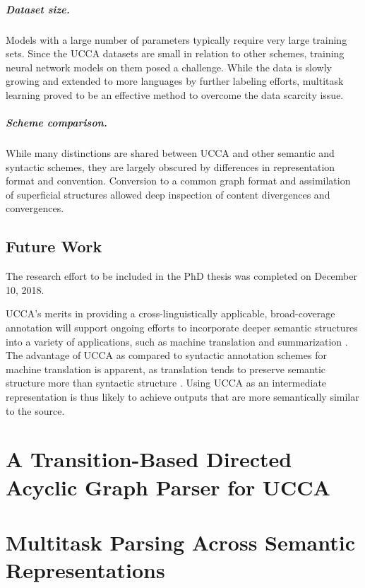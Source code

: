 \documentclass[12pt]{report}
\begin{document}
\paragraph{Dataset size.}
Models with a large number of parameters typically require very large
training sets.
Since the UCCA datasets are small in relation to other schemes,
training neural network models on them posed a challenge.
While the data is slowly growing and extended to more languages by further labeling efforts,
multitask learning proved to be an effective method to overcome the data scarcity issue.

\paragraph{Scheme comparison.}
While many distinctions are shared between UCCA and other semantic and syntactic schemes,
they are largely obscured by differences in representation format and convention.
Conversion to a common graph format and assimilation of superficial structures
allowed deep inspection of content divergences and convergences.


\section{Future Work}\label{sec:future_work}

The research effort to be included in the PhD thesis was completed on December 10, 2018.

UCCA's merits in providing a cross-linguistically applicable,
broad-coverage annotation will support ongoing efforts to incorporate deeper
semantic structures into a variety of applications, such as machine translation
\cite{jones2012semantics} and summarization \cite{liu2015toward}.
The advantage of UCCA as compared to syntactic annotation schemes for machine translation is apparent,
as translation tends to preserve semantic structure more than syntactic structure \cite{sulem2015conceptual}.
Using UCCA as an intermediate representation is thus likely to achieve outputs that are more
semantically similar to the source.

\chapter{A Transition-Based Directed Acyclic Graph Parser for UCCA}



\chapter{Multitask Parsing Across Semantic Representations}
\end{document}
